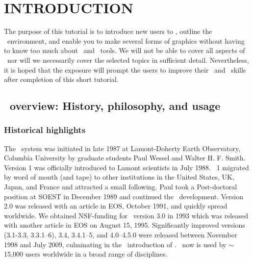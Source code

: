 \documentclass{report}
\begin{document}

\clearpage

\thispagestyle{headings}
\tableofcontents 

\chapter*{INTRODUCTION} 
\thispagestyle{headings}

The purpose of this tutorial is to introduce new users to \GMT,
outline the \GMT\ environment, and enable you to make several
forms of graphics without having to know too much about \UNIX\
and \UNIX\ tools.  We will not be able to cover all aspects of
\GMT\ nor will we necessarily cover the selected topics in
sufficient detail.  Nevertheless, it is hoped that the exposure
will prompt the users to improve their \GMT\ and \UNIX\ skills
after completion of this short tutorial.

\section*{\gmt\ overview: History, philosophy, and usage}

\subsection*{Historical highlights}

The \GMT\ system was initiated in late 1987 at Lamont-Doherty
Earth Observatory, Columbia University by graduate students Paul
Wessel and Walter H. F. Smith.  Version 1 was officially introduced
to Lamont scientists in July 1988.  \GMT\ 1 migrated by word of mouth
(and tape) to other institutions in the United States, UK, Japan, and
France and attracted a small following.  Paul took a Post-doctoral
position at SOEST in December 1989 and continued the \GMT\ development.
Version 2.0 was released with an article in EOS, October 1991, and
quickly spread worldwide.  We obtained NSF-funding for \GMT\
version 3.0 in 1993 which was released with another article in EOS
on August 15, 1995.  Significantly improved versions (3.1-3.3,
3.3.1--6), 3.4, 3.4.1--5, and 4.0--4.5.0 were released between November 1998 and
July 2009, culminating in the \GMTDOCDATE\ introduction of \GMTDOCVERSION.
\GMT\ now is used by $\sim$15,000 users worldwide in a broad range of disciplines.
\end{document}

